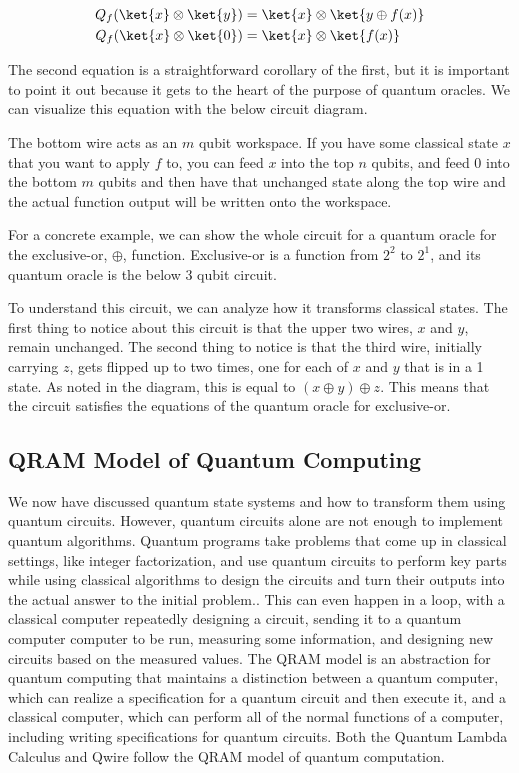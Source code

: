\begin{align*}
Q_f(\ket{x}\otimes\ket{y}) &= \ket{x} \otimes \ket{y \oplus f(x)}\\
Q_f(\ket{x}\otimes\ket{0}) &= \ket{x} \otimes \ket{f(x)}
\end{align*}

The second equation is a straightforward corollary of the first, but it is important to point it out because it gets to the heart of the purpose of quantum oracles.
We can visualize this equation with the below circuit diagram.



The bottom wire acts as an $m$ qubit workspace.
If you have some classical state $x$ that you want to apply $f$ to, you can feed $x$ into the top $n$ qubits, and feed 0 into the bottom $m$ qubits and then have that unchanged state along the top wire and the actual function output will be written onto the workspace.

For a concrete example, we can show the whole circuit for a quantum oracle for the exclusive-or, $\oplus$, function.
Exclusive-or is a function from $2^2$ to $2^1$, and its quantum oracle is the below $3$ qubit circuit.



To understand this circuit, we can analyze how it transforms classical states.
The first thing to notice about this circuit is that the upper two wires, $x$ and $y$, remain unchanged.
The second thing to notice is that the third wire, initially carrying $z$, gets flipped up to two times, one for each of $x$ and $y$ that is in a 1 state.
As noted in the diagram, this is equal to $(x \oplus y) \oplus z$.
This means that the circuit satisfies the equations of the quantum oracle for exclusive-or.
\subsection{QRAM Model of Quantum Computing}

We now have discussed quantum state systems and how to transform them using quantum circuits.
However, quantum circuits alone are not enough to implement quantum algorithms.
Quantum programs take problems that come up in classical settings, like integer factorization, and use quantum circuits to perform key parts while using classical algorithms to design the circuits and turn their outputs into the actual answer to the initial problem..
This can even happen in a loop, with a classical computer repeatedly designing a circuit, sending it to a quantum computer computer to be run, measuring some information, and designing new circuits based on the measured values.
The QRAM model is an abstraction for quantum computing that maintains a distinction between a quantum computer, which can realize a specification for a quantum circuit and then execute it, and a classical computer, which can perform all of the normal functions of a computer, including writing specifications for quantum circuits.
Both the Quantum Lambda Calculus and Qwire follow the QRAM model of quantum computation.

